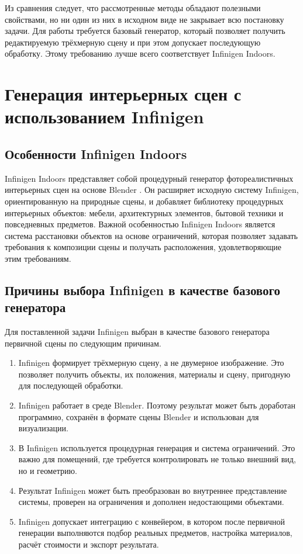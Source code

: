 \documentclass[times]{itmo-student-thesis}
\begin{document}
Из сравнения следует, что рассмотренные методы обладают полезными свойствами, но ни один из них в исходном виде не закрывает всю постановку задачи. Для работы требуется базовый генератор, который позволяет получить редактируемую трёхмерную сцену и при этом допускает последующую обработку. Этому требованию лучше всего соответствует Infinigen Indoors.

\section{Генерация интерьерных сцен с использованием Infinigen}

\subsection{Особенности Infinigen Indoors}

Infinigen Indoors представляет собой процедурный генератор фотореалистичных интерьерных сцен на основе Blender \cite{infinigen2024indoors}. Он расширяет исходную систему Infinigen, ориентированную на природные сцены, и добавляет библиотеку процедурных интерьерных объектов: мебели, архитектурных элементов, бытовой техники и повседневных предметов. Важной особенностью Infinigen Indoors является система расстановки объектов на основе ограничений, которая позволяет задавать требования к композиции сцены и получать расположения, удовлетворяющие этим требованиям.

\subsection{Причины выбора Infinigen в качестве базового генератора}

Для поставленной задачи Infinigen выбран в качестве базового генератора первичной сцены по следующим причинам.

\begin{enumerate}
  \item Infinigen формирует трёхмерную сцену, а не двумерное изображение. Это позволяет получить объекты, их положения, материалы и сцену, пригодную для последующей обработки.
  \item Infinigen работает в среде Blender. Поэтому результат может быть доработан программно, сохранён в формате сцены Blender и использован для визуализации.
  \item В Infinigen используется процедурная генерация и система ограничений. Это важно для помещений, где требуется контролировать не только внешний вид, но и геометрию.
  \item Результат Infinigen может быть преобразован во внутреннее представление системы, проверен на ограничения и дополнен недостающими объектами.
  \item Infinigen допускает интеграцию с конвейером, в котором после первичной генерации выполняются подбор реальных предметов, настройка материалов, расчёт стоимости и экспорт результата.
\end{enumerate}
\end{document}
